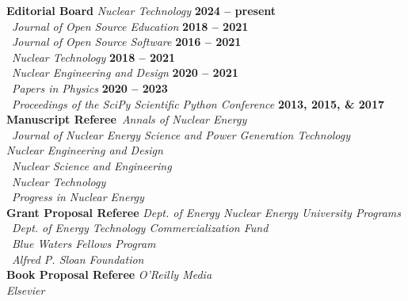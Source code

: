 \documentclass[margin,line]{resume}
\begin{document}
\begin{resume}
    \textbf{Editorial Board} \hfill \emph{Nuclear Technology} \textbf{2024 -- present}\vspace{2mm}\\%
                    \mbox{}~\hfill \emph{Journal of Open Source Education} \textbf{2018 -- 2021}\\%
                    \mbox{}~\hfill \emph{Journal of Open Source Software} \textbf{2016 -- 2021}\\%
                    \mbox{}~\hfill \emph{Nuclear Technology} \textbf{2018 -- 2021}\vspace{2mm}\\%
                    \mbox{}~\hfill \emph{Nuclear Engineering and Design} \textbf{2020 -- 2021}\vspace{2mm}\\%
                    \mbox{}~\hfill \emph{Papers in Physics} \textbf{2020 -- 2023}\vspace{2mm}\\%
                    \mbox{}~\hfill \emph{Proceedings of the SciPy Scientific Python Conference} \textbf{2013, 2015, \& 2017}\vspace{2mm}\\%
    \textbf{Manuscript Referee}~\hfill\emph{Annals of Nuclear Energy}\\%
                            \mbox{}~\hfill \emph{Journal of Nuclear Energy Science and Power Generation Technology} \\%
                            \mbox{}\hfill \emph{Nuclear Engineering and Design}\\%
                            \mbox{}~\hfill\emph{Nuclear Science and Engineering}\\%
                            \mbox{}~\hfill\emph{Nuclear Technology}\\%
                            \mbox{}~\hfill\emph{Progress in Nuclear Energy}\vspace{2mm}\\%
    \textbf{Grant Proposal Referee} \hfill \emph{Dept. of Energy Nuclear Energy University Programs}\\%
                            \mbox{}~\hfill\emph{Dept. of Energy Technology Commercialization Fund}\\%
                            \mbox{}~\hfill\emph{Blue Waters Fellows Program}\vspace{2mm}\\%
                            \mbox{}~\hfill\emph{Alfred P. Sloan Foundation}\vspace{2mm}\\%
    \textbf{Book Proposal Referee} \hfill\emph{O'Reilly Media}\\%
                            \mbox{}\hfill\emph{Elsevier}\vspace{2mm}\\%

\end{resume}
\end{document}
